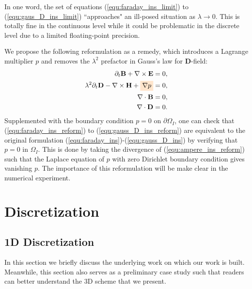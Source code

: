 \documentclass{article}
\begin{document}
In one word, the set of equations (\ref{equ:faraday_ins_limit}) to (\ref{equ:gaus_D_ins_limit}) ``approaches" an ill-posed situation as $\lambda \rightarrow 0$. This is totally fine in the continuous level while it could be problematic in the discrete level due to a limited floating-point precision. 

We propose the following reformulation as a remedy, which introduces a Lagrange multiplier $p$ and removes the $\lambda^2$ prefactor in Gauss's law for $\mathbf{D}$-field:
\begin{align}
    \partial_t \mathbf{B} + \nabla \times \mathbf{E} &= 0, \label{equ:faraday_ins_reform}\\ 
    \lambda^2 \partial_t \mathbf{D} - \nabla \times \mathbf{H} + \colorbox{orange!20}{$\nabla p$} &= 0,  \label{equ:ampere_ins_reform}\\
    \nabla \cdot \mathbf{B} &= 0, \label{equ:gauss_B_ins_reform}\\
    \nabla \cdot \mathbf{D} &= 0 \label{equ:gauss_D_ins_reform}.
\end{align}
Supplemented with the boundary condition $p = 0$ on $\partial\Omega_I$, one can check that (\ref{equ:faraday_ins_reform}) to (\ref{equ:gauss_D_ins_reform}) are equivalent to the original formulation (\ref{equ:faraday_ins})-(\ref{equ:gauss_D_ins}) by verifying that $p = 0$ in $\Omega_I$. This is done by taking the divergence of (\ref{equ:ampere_ins_reform}) such that the Laplace equation of $p$ with zero Dirichlet boundary condition gives vanishing $p$. The importance of this reformulation will be make clear in the numerical experiment.

\section{Discretization}

\subsection{1D Discretization}
In this section we briefly discuss the underlying work \cite{degond_2012} on which our work is built. Meanwhile, this section also serves as a preliminary case study such that readers can better understand the 3D scheme that we present. 
\end{document}
